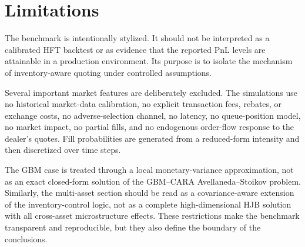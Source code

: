 \documentclass[a4paper,10pt,titlepage,oneside,openany]{book}
\theoremstyle{plain}\newtheorem{theorem}{Theorem}[chapter]
\theoremstyle{definition}\newtheorem{definition}{Definition}[chapter]
\theoremstyle{remark}\newtheorem{remark}{Remark}[chapter]
\begin{document}
\section*{Limitations}

The benchmark is intentionally stylized. It should not be interpreted as a calibrated HFT backtest or as evidence that the reported PnL levels are attainable in a production environment. Its purpose is to isolate the mechanism of inventory-aware quoting under controlled assumptions.

Several important market features are deliberately excluded. The simulations use no historical market-data calibration, no explicit transaction fees, rebates, or exchange costs, no adverse-selection channel, no latency, no queue-position model, no market impact, no partial fills, and no endogenous order-flow response to the dealer's quotes. Fill probabilities are generated from a reduced-form intensity and then discretized over time steps.

The GBM case is treated through a local monetary-variance approximation, not as an exact closed-form solution of the GBM--CARA Avellaneda--Stoikov problem. Similarly, the multi-asset section should be read as a covariance-aware extension of the inventory-control logic, not as a complete high-dimensional HJB solution with all cross-asset microstructure effects. These restrictions make the benchmark transparent and reproducible, but they also define the boundary of the conclusions.
\end{document}
